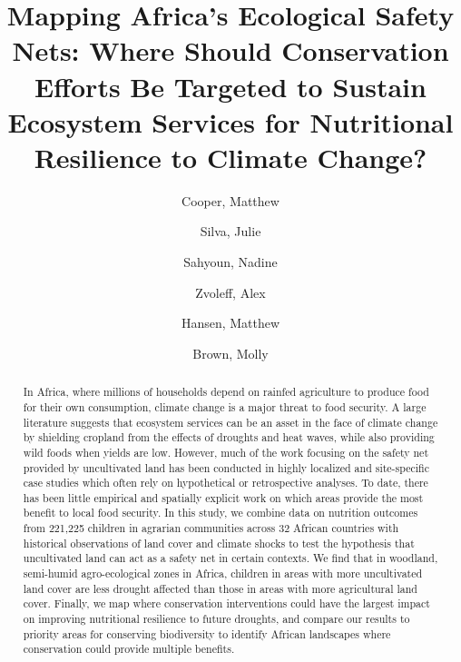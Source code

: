 \documentclass{article}
\begin{document}
\title{Mapping Africa's Ecological Safety Nets: Where Should Conservation Efforts Be Targeted to Sustain Ecosystem Services for Nutritional Resilience to Climate Change?}

\author[1,2,*]{Cooper, Matthew}
\author[2]{Silva, Julie}
\author[3]{Sahyoun, Nadine}
\author[4]{Zvoleff, Alex}
\author[2]{Hansen, Matthew}
\author[2]{Brown, Molly}


\maketitle
\begin{abstract}

In Africa, where millions of households depend on rainfed agriculture to produce food for their own consumption, climate change is a major threat to food security.  A large literature suggests that ecosystem services can be an asset in the face of climate change by shielding cropland from the effects of droughts and heat waves, while also providing wild foods when yields are low.  However, much of the work focusing on the safety net provided by uncultivated land has been conducted in highly localized and site-specific case studies which often rely on hypothetical or retrospective analyses.  To date, there has been little empirical and spatially explicit work on which areas provide the most benefit to local food security.  In this study, we combine data on nutrition outcomes from 221,225 children in agrarian communities across 32 African countries with historical observations of land cover and climate shocks to test the hypothesis that uncultivated land can act as a safety net in certain contexts.  We find that in woodland, semi-humid agro-ecological zones in Africa, children in areas with more uncultivated land cover are less drought affected than those in areas with more agricultural land cover.  Finally, we map where conservation interventions could have the largest impact on improving nutritional resilience to future droughts, and compare our results to priority areas for conserving biodiversity to identify African landscapes where conservation could provide multiple benefits.

\end{abstract}
\end{document}

